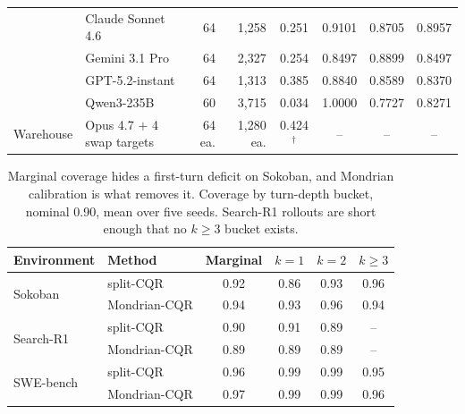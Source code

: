 \documentclass{article}
\begin{document}
\begin{table}[t]
\begin{tabular}{@{}llrrcccc@{}}
 & Claude Sonnet 4.6 & 64 & 1{,}258 & 0.251 & 0.9101 & 0.8705 & 0.8957 \\
 & Gemini 3.1 Pro & 64 & 2{,}327 & 0.254 & 0.8497 & 0.8899 & 0.8497 \\
 & GPT-5.2-instant & 64 & 1{,}313 & 0.385 & 0.8840 & 0.8589 & 0.8370 \\
 & Qwen3-235B & 60 & 3{,}715 & 0.034 & 1.0000 & 0.7727 & 0.8271 \\
\midrule
Warehouse & Opus 4.7 $+$ 4 swap targets & 64 ea. & 1{,}280 ea. & 0.424$^{\dagger}$ & -- & -- & -- \\
\bottomrule
\end{tabular}
\end{table}

\begin{table}[t]
\centering
\caption{Marginal coverage hides a first-turn deficit on Sokoban, and Mondrian calibration is what removes it. Coverage by turn-depth bucket, nominal 0.90, mean over five seeds. Search-R1 rollouts are short enough that no $k{\ge}3$ bucket exists.}
\label{tab:conditional}
\small
\begin{tabular}{@{}llcccc@{}}
\toprule
Environment & Method & Marginal & $k{=}1$ & $k{=}2$ & $k{\ge}3$ \\
\midrule
\multirow{2}{*}{Sokoban}
 & split-CQR & 0.92 & 0.86 & 0.93 & 0.96 \\
 & Mondrian-CQR & 0.94 & 0.93 & 0.96 & 0.94 \\
\midrule
\multirow{2}{*}{Search-R1}
 & split-CQR & 0.90 & 0.91 & 0.89 & -- \\
 & Mondrian-CQR & 0.89 & 0.89 & 0.89 & -- \\
\midrule
\multirow{2}{*}{SWE-bench}
 & split-CQR & 0.96 & 0.99 & 0.99 & 0.95 \\
 & Mondrian-CQR & 0.97 & 0.99 & 0.99 & 0.96 \\
\bottomrule
\end{tabular}
\end{table}
\end{document}
